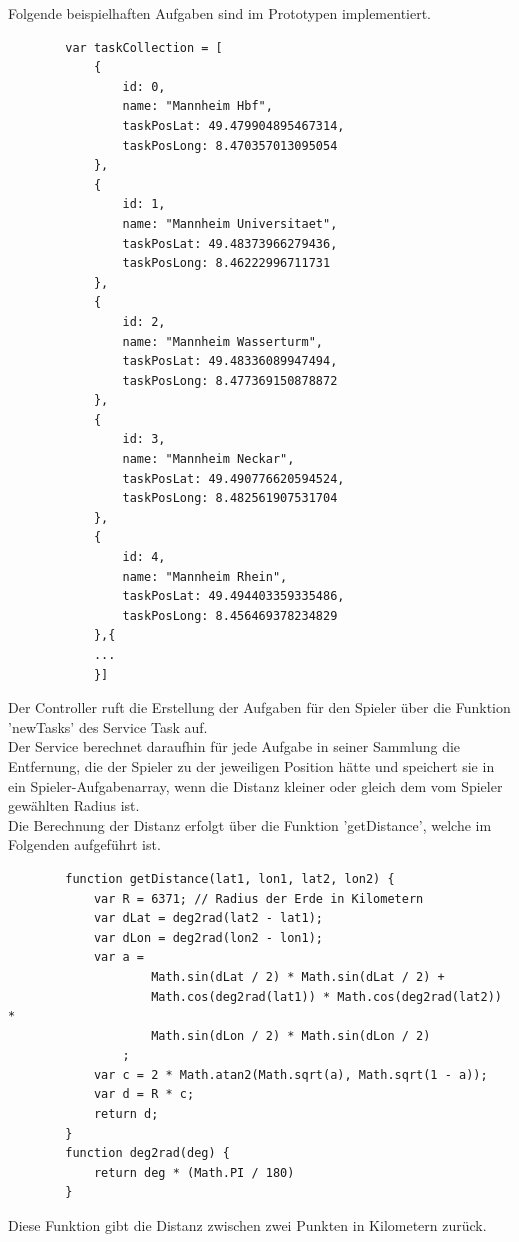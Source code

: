 Folgende beispielhaften Aufgaben sind im Prototypen implementiert.
\begin{lstlisting}
        var taskCollection = [
            {
                id: 0,
                name: "Mannheim Hbf",
                taskPosLat: 49.479904895467314,
                taskPosLong: 8.470357013095054
            },
            {
                id: 1,
                name: "Mannheim Universitaet",
                taskPosLat: 49.48373966279436,
                taskPosLong: 8.46222996711731
            },
            {
                id: 2,
                name: "Mannheim Wasserturm",
                taskPosLat: 49.48336089947494,
                taskPosLong: 8.477369150878872
            },
            {
                id: 3,
                name: "Mannheim Neckar",
                taskPosLat: 49.490776620594524,
                taskPosLong: 8.482561907531704
            },
            {
                id: 4,
                name: "Mannheim Rhein",
                taskPosLat: 49.494403359335486,
                taskPosLong: 8.456469378234829
            },{
            ...
            }]
\end{lstlisting}
Der Controller ruft die Erstellung der Aufgaben für den Spieler über die Funktion 'newTasks' des Service Task auf.
\\
Der Service berechnet daraufhin für jede Aufgabe in seiner Sammlung die Entfernung, die der Spieler zu der jeweiligen Position hätte und speichert sie in ein Spieler-Aufgabenarray, wenn die Distanz kleiner oder gleich dem vom Spieler gewählten Radius ist.
\\
Die Berechnung der Distanz erfolgt über die Funktion 'getDistance', welche im Folgenden aufgeführt ist.
\begin{lstlisting}
        function getDistance(lat1, lon1, lat2, lon2) {
            var R = 6371; // Radius der Erde in Kilometern
            var dLat = deg2rad(lat2 - lat1);
            var dLon = deg2rad(lon2 - lon1);
            var a =
                    Math.sin(dLat / 2) * Math.sin(dLat / 2) +
                    Math.cos(deg2rad(lat1)) * Math.cos(deg2rad(lat2)) *
                    Math.sin(dLon / 2) * Math.sin(dLon / 2)
                ;
            var c = 2 * Math.atan2(Math.sqrt(a), Math.sqrt(1 - a));
            var d = R * c;
            return d;
        }
        function deg2rad(deg) {
            return deg * (Math.PI / 180)
        }
\end{lstlisting}
Diese Funktion gibt die Distanz zwischen zwei Punkten in Kilometern zurück.
\\
